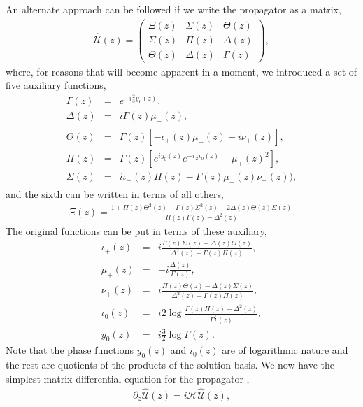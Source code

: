\documentclass[9pt,twocolumn,twoside]{osajnl}
\begin{document}
An alternate approach can be followed if we write the propagator as a matrix,
\begin{eqnarray}
\hat{\mathcal{U}}(z) = \left( \begin{array}{ccc} 
\Xi(z) & \Sigma(z) & \Theta(z) \\
\Sigma(z) & \Pi(z)    & \Delta(z) \\
\Theta(z) & \Delta(z) & \Gamma(z)
\end{array}  \right),
\end{eqnarray}
where, for reasons that will become apparent in a moment, we introduced a set of five auxiliary functions,
\begin{eqnarray}
	\Gamma(z) &=& e^{- i \frac{2}{3}  y_{0}(z)}, \\
	\Delta(z)&=& i \Gamma(z) \mu_{+}(z), \\
	\Theta(z)&=& \Gamma(z) \left[ -\iota_{+}(z) \mu_{+}(z) + i \nu_{+}(z) \right], \\
	\Pi(z)&=& \Gamma(z) \left[ e^{i y_0 (z)}e^{-i \frac{1}{2}\iota_0 (z)}
		-\mu_{+} (z)^2 \right], \\	
	\Sigma(z)&=& i \iota_{+}(z) \Pi(z) - \Gamma(z) \mu_{+} (z) \nu_{+}(z)), 
\end{eqnarray}
and the sixth can be written in terms of all others,  
\begin{eqnarray}
\Xi(z) = \frac{1 + \Pi(z) \Theta^{2}(z) + \Gamma(z) \Sigma^{2}(z)- 2 \Delta(z) \Theta(z) \Sigma(z)}{ \Pi(z) \Gamma(z) - \Delta^{2}(z)}.
\end{eqnarray}
The original functions can be put in terms of these auxiliary,
\begin{eqnarray}
\iota_{+}(z) &=& i \frac{\Gamma(z)\Sigma(z) - \Delta(z)\Theta(z)}{\Delta^2(z)-\Gamma(z)\Pi(z)}, \\
\mu_{+}(z) &=& -i \frac{\Delta(z)}{\Gamma(z)},\\
\nu_{+}(z) &=& i \frac{\Pi(z)\Theta(z) - \Delta(z)\Sigma(z)}{\Delta^2(z)-\Gamma(z)\Pi(z)} ,\\
\iota_{0}(z) &=& i 2 \log \frac{\Gamma(z) \Pi(z) - \Delta^{2}(z)}{\Gamma^{\frac{1}{2}}(z) } , \\
y_{0}(z) &=& i \frac{3}{2} \log \Gamma(z) .
\end{eqnarray}
Note that the phase functions $y_0(z)$ and $i_0(z)$ are of logarithmic nature and the rest are quotients of the products of the solution basis. 
We now have the simplest matrix differential equation for the propagator \cite{Reid1939p414,Levin1959p519}, 
\begin{eqnarray}
\partial_{z} \hat{\mathcal{U}}(z) = i \mathcal{H} \hat{\mathcal{U}}(z) ,
\end{eqnarray}
\end{document}
